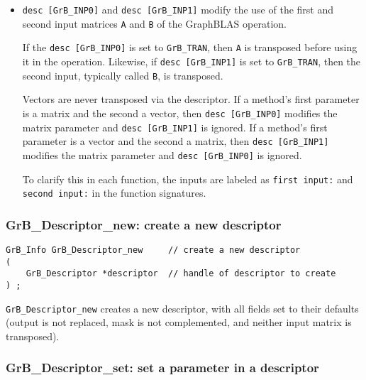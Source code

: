 \documentclass[12pt]{article}
\begin{document}
\begin{itemize}
\item \verb'desc [GrB_INP0]' and \verb'desc [GrB_INP1]' modify the use of the
    first and second input matrices \verb'A' and \verb'B' of the GraphBLAS
    operation.

    If the \verb'desc [GrB_INP0]' is set to \verb'GrB_TRAN', then \verb'A' is
    transposed before using it in the operation.  Likewise, if
    \verb'desc [GrB_INP1]' is set to \verb'GrB_TRAN', then the second input,
    typically called \verb'B', is transposed.

    Vectors are never transposed via the descriptor.  If a method's first
    parameter is a matrix and the second a vector, then \verb'desc [GrB_INP0]'
    modifies the matrix parameter and \verb'desc [GrB_INP1]' is ignored.  If a
    method's first parameter is a vector and the second a matrix, then
    \verb'desc [GrB_INP1]' modifies the matrix parameter and
    \verb'desc [GrB_INP0]' is ignored.

    To clarify this in each function, the inputs are labeled as
    \verb'first input:' and \verb'second input:' in the function signatures.

\end{itemize}

\subsubsection{{\sf GrB\_Descriptor\_new:}  create a new descriptor}
\label{descriptor_new}

\begin{mdframed}[userdefinedwidth=6in]
{\footnotesize
\begin{verbatim}
GrB_Info GrB_Descriptor_new     // create a new descriptor
(
    GrB_Descriptor *descriptor  // handle of descriptor to create
) ;
\end{verbatim} } \end{mdframed}

\verb'GrB_Descriptor_new' creates a new descriptor, with all fields set to
their defaults (output is not replaced, mask is not complemented, and neither
input matrix is transposed).

\subsubsection{{\sf GrB\_Descriptor\_set:}  set a parameter in a descriptor}
\label{descriptor_set}
\end{document}
